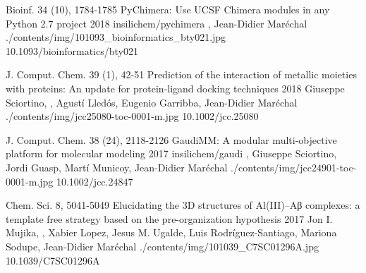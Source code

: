 \begin{cventries}
  \pubentry
    {Bioinf. 34 (10), 1784-1785} %
    {PyChimera: Use UCSF Chimera modules in any Python 2.7 project} %
    {2018} %
    {insilichem/pychimera} %
    {,\textsuperscript{\dagger} Jean-Didier Maréchal\textsuperscript{\dagger}} %
    {./contents/img/101093_bioinformatics_bty021.jpg} %
    {10.1093/bioinformatics/bty021} %

  \pubentry
    {J. Comput. Chem. 39 (1), 42-51} %
    {Prediction of the interaction of metallic moieties with proteins: An update for protein-ligand docking techniques} %
    {2018} %
    {} %
    {Giuseppe Sciortino, , Agustí Lledós, Eugenio Garribba, Jean-Didier Maréchal} %
    {./contents/img/jcc25080-toc-0001-m.jpg} %
    {10.1002/jcc.25080} %

  \pubentry
    {J. Comput. Chem. 38 (24), 2118-2126} %
    {GaudiMM: A modular multi-objective platform for molecular modeling} %
    {2017} %
    {insilichem/gaudi} %
    {,\textsuperscript{\dagger} Giuseppe Sciortino, Jordi Guasp, Martí Municoy, Jean-Didier Maréchal\textsuperscript{\dagger}} %
    {./contents/img/jcc24901-toc-0001-m.jpg} %
    {10.1002/jcc.24847} %

    \pubentry
    {Chem. Sci. 8, 5041-5049} %
    {Elucidating the 3D structures of Al(III)–Aβ complexes: a template free strategy based on the pre-organization hypothesis} %
    {2017} %
    {} %
    {Jon I. Mujika, , Xabier Lopez, Jesus M. Ugalde, Luis Rodríguez-Santiago, Mariona Sodupe, Jean-Didier Maréchal} %
    {./contents/img/101039_C7SC01296A.jpg} %
    {10.1039/C7SC01296A} %

\end{cventries}

